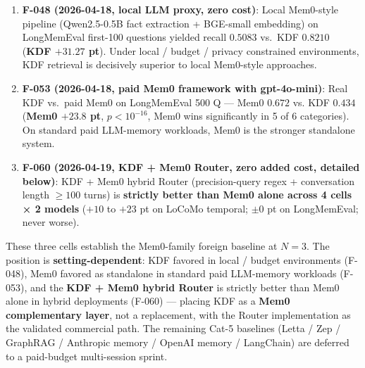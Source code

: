 \begin{enumerate}
\def\labelenumi{\arabic{enumi}.}
\tightlist
\item
  \textbf{F-048 (2026-04-18, local LLM proxy, zero cost)}: Local
  Mem0-style pipeline (Qwen2.5-0.5B fact extraction + BGE-small
  embedding) on LongMemEval first-100 questions yielded recall
  \(0.5083\) vs.~KDF \(0.8210\) (\textbf{KDF \(+31.27\) pt}). Under local /
  budget / privacy constrained environments, KDF retrieval is
  decisively superior to local Mem0-style approaches.
\item
  \textbf{F-053 (2026-04-18, paid Mem0 framework with gpt-4o-mini)}:
  Real KDF vs.~paid Mem0 on LongMemEval 500 Q --- Mem0 \(0.672\) vs.
  KDF \(0.434\) (\textbf{Mem0 \(+23.8\) pt}, \(p < 10^{-16}\), Mem0 wins
  significantly in 5 of 6 categories). On standard paid LLM-memory
  workloads, Mem0 is the stronger standalone system.
\item
  \textbf{F-060 (2026-04-19, KDF + Mem0 Router, zero added cost, detailed
  below)}: KDF + Mem0 hybrid Router (precision-query regex +
  conversation length \(\ge 100\) turns) is \textbf{strictly better than Mem0
  alone across 4 cells × 2 models} (\(+10\) to \(+23\) pt on LoCoMo
  temporal; \(\pm 0\) pt on LongMemEval; never worse).
\end{enumerate}

These three cells establish the Mem0-family foreign baseline at \(N=3\).
The position is \textbf{setting-dependent}: KDF favored in local / budget
environments (F-048), Mem0 favored as standalone in standard paid
LLM-memory workloads (F-053), and the \textbf{KDF + Mem0 hybrid Router} is
strictly better than Mem0 alone in hybrid deployments (F-060) ---
placing KDF as a \textbf{Mem0 complementary layer}, not a replacement, with
the Router implementation as the validated commercial path. The
remaining Cat-5 baselines (Letta / Zep / GraphRAG / Anthropic memory /
OpenAI memory / LangChain) are deferred to a paid-budget multi-session
sprint.

